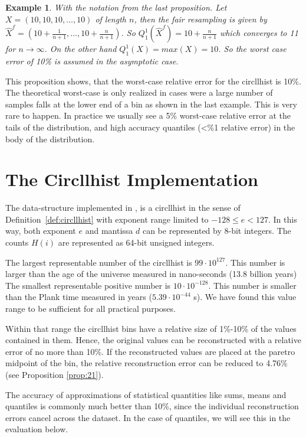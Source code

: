 \documentclass{article}
\theoremstyle{plain}
\newtheorem{example}[definition]{Example}
\theoremstyle{remark}
\newcommand{\ra}{\rightarrow}
\begin{document}
\begin{example}
  With the notation from the last proposition.  Let $X=(10,10,10, \dots, 10)$ of length $n$, then
  the fair resampling is given by $\hat{X}^f = (10 + \frac{1}{n+1}, \dots, 10 + \frac{n}{n+1})$.
  So $Q^1_1(\hat{X}^f) = 10 + \frac{n}{n+1}$ which converges to 11 for $n \ra \infty$.
  On the other hand $Q^1_1(X) = max(X) = 10$. So the worst case error of 10\% is assumed in
  the asymptotic case.
\end{example}

This proposition shows, that the worst-case relative error for the circllhist is 10\%.  The
theoretical worst-case is only realized in cases were a large number of samples falls at the lower
end of a bin as shown in the last example.  This is very rare to happen.  In practice we usually
see a 5\% worst-case relative error at the tails of the distribution, and high accuracy
quantiles (<\%1 relative error) in the body of the distribution.

\section{The Circllhist Implementation}

The data-structure implemented in \cite{libcircllhist}, is a circllhist in the sense of
Definition~\ref{def:circllhist} with exponent range limited to $-128 \leq e < 127$.
In this way, both exponent $e$ and mantissa $d$ can be represented by 8-bit integers.
The counts $H(i)$ are represented as 64-bit unsigned integers.

The largest representable number of the circllhist is $99 \cdot 10^{127}$.
This number is larger than the age of the universe measured in nano-seconds (13.8 billion years)
The smallest representable positive number is $10 \cdot 10^{-128}$.
This number is smaller than the Plank time measured in years ($5.39 \cdot 10^{-44}$ s).
We have found this value range to be sufficient for all practical purposes.

Within that range the circllhist bins have a relative size of 1\%-10\% of the values contained in
them. Hence, the original values can be reconstructed with a relative error of no more than 10\%.
If the reconstructed values are placed at the paretro midpoint of the bin, the relative reconstruction
error can be reduced to 4.76\% (see Proposition \ref{prop:21}).

The accuracy of approximations of statistical quantities like sums, means and quantiles is commonly
much better than 10\%, since the individual reconstruction errors cancel across the dataset.
In the case of quantiles, we will see this in the evaluation below.
\end{document}

